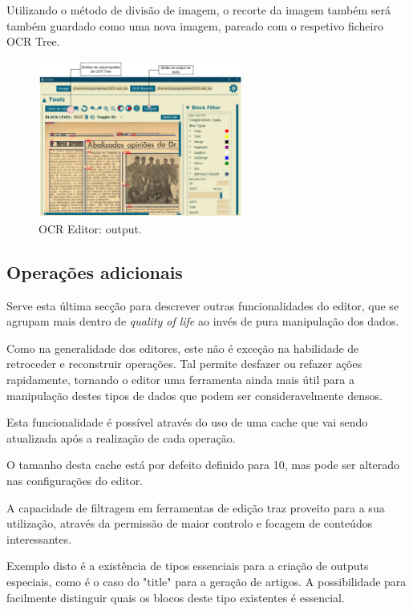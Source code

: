 Utilizando o método de divisão de imagem, o recorte da imagem também será também guardado como uma nova imagem, pareado com o respetivo ficheiro OCR Tree.


\begin{figure}[H]
	\centering
	\includegraphics[width=0.6\textwidth]{images/ilustracoes/ocr_editor_output.png}
	\caption{OCR Editor: output.}
	\label{fig:ocr_editor_output}
\end{figure}


\subsection{Operações adicionais}

Serve esta última secção para descrever outras funcionalidades do editor, que se agrupam mais dentro de \textit{quality of life} ao invés de pura manipulação dos dados.


Como na generalidade dos editores, este não é exceção na habilidade de retroceder e reconstruir operações. Tal permite desfazer ou refazer ações rapidamente, tornando o editor uma ferramenta ainda mais útil para a manipulação destes tipos de dados que podem ser consideravelmente densos.


Esta funcionalidade é possível através do uso de uma cache que vai sendo atualizada após a realização de cada operação.

O tamanho desta cache está por defeito definido para 10, mas pode ser alterado nas configurações do editor.



A capacidade de filtragem em ferramentas de edição traz proveito para a sua utilização, através da permissão de maior controlo e focagem de conteúdos interessantes.

Exemplo disto é a existência de tipos essenciais para a criação de outputs especiais, como é o caso do "title" para a geração de artigos. A possibilidade para facilmente distinguir quais os blocos deste tipo existentes é essencial. 

